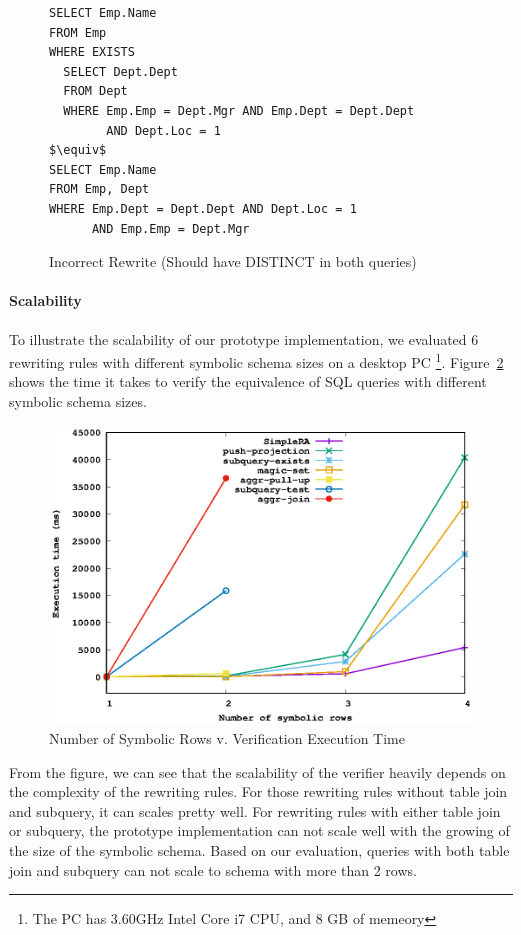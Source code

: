 \begin{figure}[!htb]
\begin{lstlisting}[style=sql,xleftmargin=.2\textwidth,mathescape=true]
SELECT Emp.Name
FROM Emp
WHERE EXISTS 
  SELECT Dept.Dept
  FROM Dept
  WHERE Emp.Emp = Dept.Mgr AND Emp.Dept = Dept.Dept
        AND Dept.Loc = 1
$\equiv$
SELECT Emp.Name
FROM Emp, Dept
WHERE Emp.Dept = Dept.Dept AND Dept.Loc = 1 
      AND Emp.Emp = Dept.Mgr
\end{lstlisting}
\caption{Incorrect Rewrite (Should have DISTINCT in both queries)}
\label{fig:push-proj}
\end{figure}

\paragraph{Scalability}
To illustrate the scalability of our prototype implementation, we evaluated
6 rewriting rules with different symbolic schema sizes on a desktop PC
\footnote{The PC has 3.60GHz Intel Core i7 CPU, and 8 GB of memeory}.
Figure~\ref{fig:scale} shows the time it takes to verify the equivalence of SQL queries
with different symbolic schema sizes.

\begin{figure}[ht]
  \centering
  \includegraphics[width=0.7\linewidth]{scale.eps}
  \caption{Number of Symbolic Rows v. Verification Execution Time}
  \label{fig:scale}
\end{figure}

From the figure, we can see that the scalability of the verifier heavily depends 
on the complexity of the rewriting rules.
For those rewriting rules without table join and subquery, it can scales pretty well.
For rewriting rules with either table join or subquery, the prototype implementation can 
not scale well with the growing of the size of the symbolic schema.
Based on our evaluation, queries with both table join and subquery can not scale to schema with
more than 2 rows.

